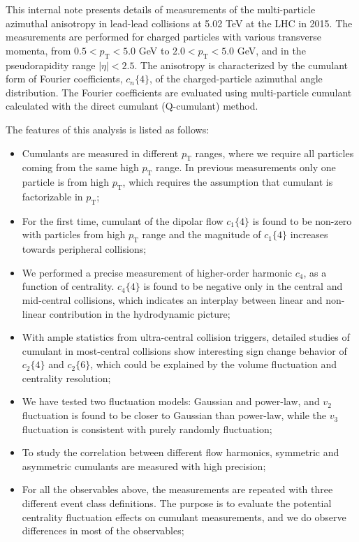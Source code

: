 This internal note presents details of measurements of the multi-particle azimuthal anisotropy in lead-lead collisions at 5.02 TeV at the LHC in 2015. The measurements are performed for charged particles with various transverse momenta, from $0.5<p_{\text{T}}<5.0$ GeV to $2.0<p_{\text{T}}<5.0$ GeV, and in the pseudorapidity range $|\eta|<2.5$. The anisotropy is characterized by the cumulant form of Fourier coefficients, $c_{n}\{4\}$, of the charged-particle azimuthal angle distribution. The Fourier coefficients are evaluated using multi-particle cumulant calculated with the direct cumulant (Q-cumulant) method.

The features of this analysis is listed as follows:
\begin{itemize}
\item Cumulants are measured in different $p_\text{T}$ ranges, where we require all particles coming from the same high $p_\text{T}$ range. In previous measurements only one particle is from high $p_\text{T}$, which requires the assumption that cumulant is factorizable in $p_\text{T}$;
\item For the first time, cumulant of the dipolar flow $c_1\{4\}$ is found to be non-zero with particles from high $p_\text{T}$ range and the magnitude of $c_1\{4\}$ increases towards peripheral collisions;
\item We performed a precise measurement of higher-order harmonic $c_4$, as a function of centrality. $c_4\{4\}$ is found to be negative only in the central and mid-central collisions, which indicates an interplay between linear and non-linear contribution in the hydrodynamic picture;
\item With ample statistics from ultra-central collision triggers, detailed studies of cumulant in most-central collisions show interesting sign change behavior of $c_2\{4\}$ and $c_2\{6\}$, which could be explained by the volume fluctuation and centrality resolution;
\item We have tested two fluctuation models: Gaussian and power-law, and $v_2$ fluctuation is found to be closer to Gaussian than power-law, while the $v_3$ fluctuation is consistent with purely randomly fluctuation;
\item To study the correlation between different flow harmonics, symmetric and asymmetric cumulants are measured with high precision;
\item For all the observables above, the measurements are repeated with three different event class definitions. The purpose is to evaluate the potential centrality fluctuation effects on cumulant measurements, and we do observe differences in most of the observables;
\end{itemize}

